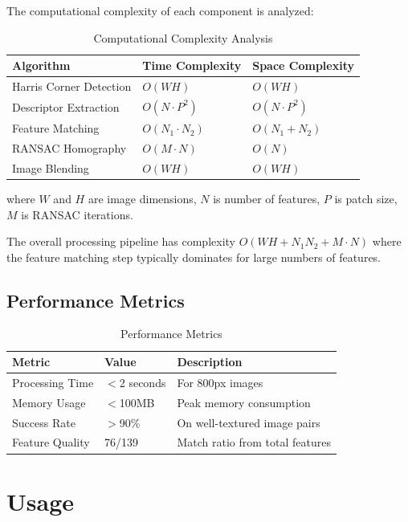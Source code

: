 \documentclass[12pt,a4paper]{article}
\begin{document}
The computational complexity of each component is analyzed:

\begin{table}[h]
\centering
\caption{Computational Complexity Analysis}
\begin{tabular}{lll}
\toprule
\textbf{Algorithm} & \textbf{Time Complexity} & \textbf{Space Complexity} \\
\midrule
Harris Corner Detection & $O(WH)$ & $O(WH)$ \\
Descriptor Extraction & $O(N \cdot P^2)$ & $O(N \cdot P^2)$ \\
Feature Matching & $O(N_1 \cdot N_2)$ & $O(N_1 + N_2)$ \\
RANSAC Homography & $O(M \cdot N)$ & $O(N)$ \\
Image Blending & $O(WH)$ & $O(WH)$ \\
\bottomrule
\end{tabular}
\label{tab:complexity}
\end{table}

where $W$ and $H$ are image dimensions, $N$ is number of features, $P$ is patch size, $M$ is RANSAC iterations.

The overall processing pipeline has complexity $O(WH + N_1 N_2 + M \cdot N)$ where the feature matching step typically dominates for large numbers of features.

\subsection{Performance Metrics}

\begin{table}[h]
\centering
\caption{Performance Metrics}
\begin{tabular}{lll}
\toprule
\textbf{Metric} & \textbf{Value} & \textbf{Description} \\
\midrule
Processing Time & $<$2 seconds & For 800px images \\
Memory Usage & $<$100MB & Peak memory consumption \\
Success Rate & $>$90\% & On well-textured image pairs \\
Feature Quality & 76/139 & Match ratio from total features \\
\bottomrule
\end{tabular}
\end{table}

\section{Usage}
\end{document}
